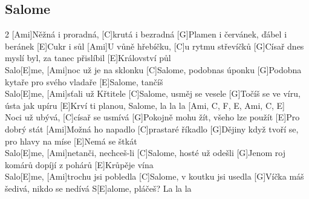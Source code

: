 \documentclass[12pt]{article}
\begin{document}
\subsection{Salome}
\begin{multicols}{2}
	[Ami]Něžná i proradná, [C]krutá i bezradná
	[G]Plamen i červánek, ďábel i beránek
	[E]Cukr i sůl
	[Ami]U vůně hřebíčku, [C]u rytmu střevíčků
	[G]Císař dnes myslí byl, za tanec přislíbil
	[E]Království půl
	\\
	[Ami]Salo[E]me, [Ami]noc už je na sklonku
	[C]Salome, podobnas úponku
	[G]Podobna kytaře pro svého vladaře
	[E]Salome, tančíš
	\\
	[Ami]Salo[E]me, [Ami]sťali už Křtitele
	[C]Salome, usměj se vesele
	[G]Točíš se ve víru, ústa jak upíru
	[E]Krví ti planou, Salome, 
	la la la [Ami, C, F, E, Ami, C, E]
	\\
	[Ami]Noci už ubývá, [C]císař se usmívá
	[G]Pokojně mohu žít, všeho lze použít
	[E]Pro dobrý stát
	[Ami]Možná ho napadlo [C]prastaré říkadlo
	[G]Dějiny když tvoří se, pro hlavy na míse
	[E]Nemá se štkát
	\\
	[Ami]Salo[E]me, [Ami]netanči, nechceš-li
	[C]Salome, hosté už odešli
	[G]Jenom roj komárů dopíjí z pohárů
	[E]Krůpěje vína
	\\
	[Ami]Salo[E]me, [Ami]trochu jsi pobledla
	[C]Salome, v koutku jsi usedla
	[G]Víčka máš šedivá, nikdo se nedívá
	S[E]alome, pláčeš? La la la
\end{multicols}
\end{document}
